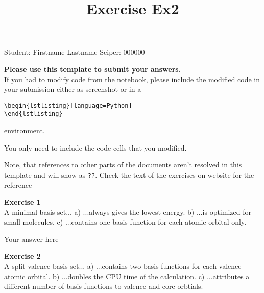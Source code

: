 \documentclass{article}
\title{Exercise Ex2}
\begin{document}
\maketitle\maketitle
\begin{center}\logo\end{center}


Student:  Firstname Lastname    Sciper: 000000

\begin{mdframed}
\textbf{Please use this template to submit your answers.}\\
If you had to modify code from the notebook, please include the modified code in your submission either as screenshot or in a

\begin{verbatim}
\begin{lstlisting}[language=Python]
\end{lstlisting}
\end{verbatim}

environment.

You only need to include the code cells that you modified.

Note, that references to other parts of the documents aren't resolved in this template and will show as \texttt{??}. Check the text of the exercises on website for the reference
\end{mdframed}

\begin{mdframed}
\textbf{Exercise 1}\\
A minimal basis set...\newline
a) ...always gives the lowest energy.\newline
b) ...is optimized for small molecules.\newline
c) ...contains one basis function for each atomic orbital only.
\end{mdframed}

Your answer here

\begin{mdframed}
\textbf{Exercise 2}\\
A split-valence basis set...\newline
a) ...contains two basis functions for each valence atomic orbital.\newline
b) ...doubles the CPU time of the calculation.\newline
c) ...attributes a different number of basis functions to valence and
core orbtials.
\end{mdframed}
\end{document}
